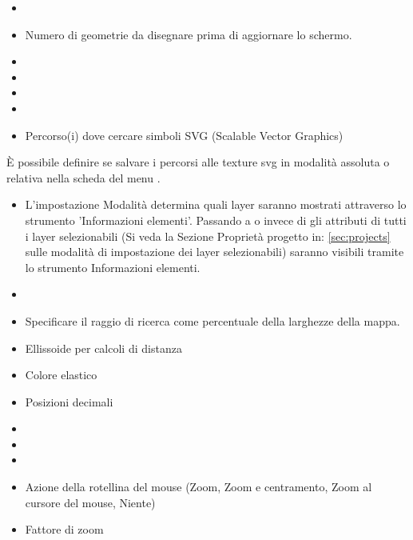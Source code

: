 
\begin{itemize}
\item {}
\item Numero di geometrie da disegnare prima di aggiornare lo schermo.
\item {}
\item {}
\item {}
\item {}
\item Percorso(i) dove cercare simboli SVG (Scalable Vector Graphics) 
\end{itemize}

È possibile definire se salvare i percorsi alle texture svg in modalità assoluta o relativa nella scheda  
del menu  \arrow {}.


\begin{itemize}
\item L'impostazione Modalità determina quali layer saranno mostrati attraverso
lo strumento 'Informazioni elementi'. Passando a  o  invece di  
 gli attributi di tutti i layer selezionabili 
(Si veda la Sezione Proprietà progetto in: \ref{sec:projects} sulle modalità di impostazione dei layer selezionabili) 
saranno visibili tramite lo strumento Informazioni elementi.
\item {}
\item Specificare il raggio di ricerca come percentuale della larghezze della mappa.
\item Ellissoide per calcoli di distanza
\item Colore elastico
\item Posizioni decimali
\item {}
\item {}
\item {}
\item Azione della rotellina del mouse (Zoom, Zoom e centramento, Zoom al cursore del mouse, Niente)
\item Fattore di zoom
\end{itemize}

